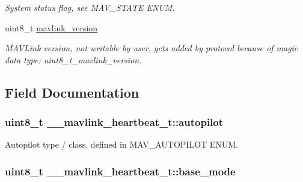 \begin{DoxyCompactItemize}
\begin{DoxyCompactList}\small\item\em System status flag, see M\+A\+V\+\_\+\+S\+T\+A\+T\+E E\+N\+U\+M. \end{DoxyCompactList}\item 
uint8\+\_\+t \hyperlink{struct____mavlink__heartbeat__t_a235d5b6a09fa9b24b3ef7b7a28d15b97}{mavlink\+\_\+version}
\begin{DoxyCompactList}\small\item\em M\+A\+V\+Link version, not writable by user, gets added by protocol because of magic data type\+: uint8\+\_\+t\+\_\+mavlink\+\_\+version. \end{DoxyCompactList}\end{DoxyCompactItemize}


\subsection{Field Documentation}
\hypertarget{struct____mavlink__heartbeat__t_a5be04782d8a0bb715ad26c25cce74b9b}{
\subsubsection[{autopilot}]{\setlength{\rightskip}{0pt plus 5cm}uint8\+\_\+t \+\_\+\+\_\+mavlink\+\_\+heartbeat\+\_\+t\+::autopilot}}\label{struct____mavlink__heartbeat__t_a5be04782d8a0bb715ad26c25cce74b9b}


Autopilot type / class. defined in M\+A\+V\+\_\+\+A\+U\+T\+O\+P\+I\+L\+O\+T E\+N\+U\+M. 

\hypertarget{struct____mavlink__heartbeat__t_a816ec38dcbb0f4948185efbdd96ebb5e}{
\subsubsection[{base\+\_\+mode}]{\setlength{\rightskip}{0pt plus 5cm}uint8\+\_\+t \+\_\+\+\_\+mavlink\+\_\+heartbeat\+\_\+t\+::base\+\_\+mode}}\label{struct____mavlink__heartbeat__t_a816ec38dcbb0f4948185efbdd96ebb5e}


